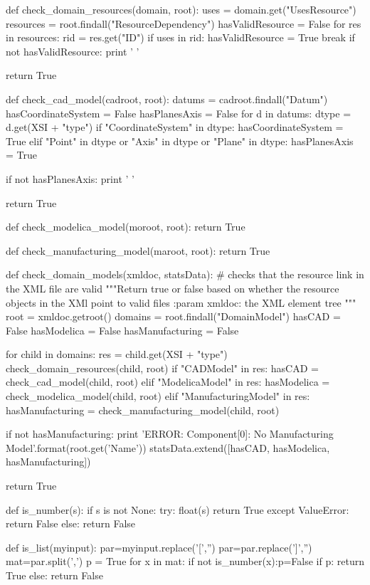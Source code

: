 \begin{MyVerbatim}
def check_domain_resources(domain, root):
    uses = domain.get("UsesResource")
    resources = root.findall("ResourceDependency")
    hasValidResource = False
    for res in resources:
        rid = res.get("ID")
        if uses in rid:
            hasValidResource = True
            break
    if not hasValidResource:
        print ' '


    return True


def check_cad_model(cadroot, root):
    datums = cadroot.findall("Datum")
    hasCoordinateSystem = False
    hasPlanesAxis = False
    for d in datums:
        dtype = d.get(XSI + "type")
        if "CoordinateSystem" in dtype:
            hasCoordinateSystem = True
        elif "Point" in dtype or "Axis" in dtype or "Plane" in dtype:
            hasPlanesAxis = True

    if not hasPlanesAxis:
        print ' '

    return True


def check_modelica_model(moroot, root):
    return True


def check_manufacturing_model(maroot, root):
    return True


def check_domain_models(xmldoc, statsData):  # checks that the resource link in the XML file are valid
    """Return true or false based on whether the resource objects in the 
       XMl point to valid files
    :param xmldoc: the XML element tree
    """
    root = xmldoc.getroot()
    domains = root.findall("DomainModel")
    hasCAD = False
    hasModelica = False
    hasManufacturing = False

    for child in domains:
        res = child.get(XSI + "type")
        check_domain_resources(child, root)
        if "CADModel" in res:
            hasCAD = check_cad_model(child, root)
        elif "ModelicaModel" in res:
            hasModelica = check_modelica_model(child, root)
        elif "ManufacturingModel" in res:
            hasManufacturing =  check_manufacturing_model(child, root)

    if not hasManufacturing:
        print 'ERROR: Component[{0}]: No Manufacturing Model'.format(root.get('Name'))
    statsData.extend([hasCAD, hasModelica, hasManufacturing])

    return True


def is_number(s):
    if s is not None:
        try:
            float(s)
            return True
        except ValueError:
            return False
    else: return False


def is_list(myinput):
    par=myinput.replace('[','')
    par=par.replace(']','')
    mat=par.split(',')
    p = True 
    for x in mat:
        if not is_number(x):p=False
    if p: return True
    else: return False



\end{MyVerbatim}
